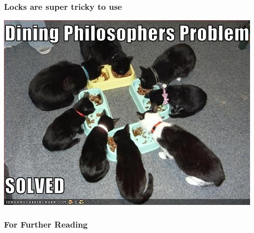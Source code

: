 \documentclass{beamer}
\begin{document}
\begin{frame}
  \frametitle{Locks are super tricky to use}
  \includegraphics[scale=0.6]{dpsolved}
\end{frame}
\begin{frame}
  \frametitle{For Further Reading}
%   



\end{frame}
\end{document}
